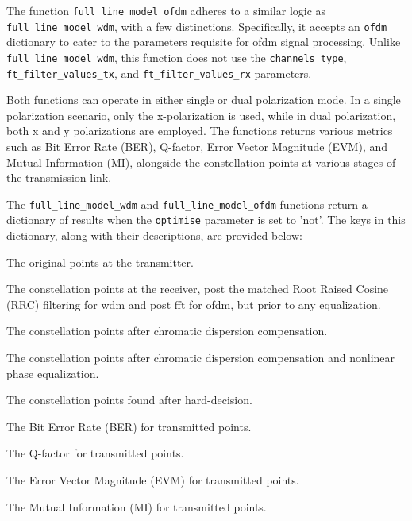 The function \texttt{full\_line\_model\_ofdm} adheres to a similar logic as \texttt{full\_line\_model\_wdm}, with a few distinctions. Specifically, it accepts an \texttt{ofdm} dictionary to cater to the parameters requisite for \Gls{ofdm} signal processing. Unlike \texttt{full\_line\_model\_wdm}, this function does not use the \texttt{channels\_type}, \texttt{ft\_filter\_values\_tx}, and \texttt{ft\_filter\_values\_rx} parameters.


Both functions can operate in either single or dual polarization mode. In a single polarization scenario, only the x-polarization is used, while in dual polarization, both x and y polarizations are employed. The functions returns various metrics such as Bit Error Rate (BER), Q-factor, Error Vector Magnitude (EVM), and Mutual Information (MI), alongside the constellation points at various stages of the transmission link.

The \texttt{full\_line\_model\_wdm} and \texttt{full\_line\_model\_ofdm} functions return a dictionary of results when the \texttt{optimise} parameter is set to 'not'. The keys in this dictionary, along with their descriptions, are provided below:

\begin{description}[style=multiline, leftmargin=4cm, font=\normalfont]
    \item[\texttt{points\_orig}] The original points at the transmitter.
    \item[\texttt{points\_noneq}] The constellation points at the receiver, post the matched Root Raised Cosine (RRC) filtering for \acrshort{wdm} and post \acrshort{fft} for \acrshort{ofdm}, but prior to any equalization.
    \item[\texttt{points}] The constellation points after chromatic dispersion compensation.
    \item[\texttt{points\_shifted}] The constellation points after chromatic dispersion compensation and nonlinear phase equalization.
    \item[\texttt{points\_found}] The constellation points found after hard-decision.
    \item[\texttt{ber}] The Bit Error Rate (BER) for transmitted points.
    \item[\texttt{q}] The Q-factor for transmitted points.
    \item[\texttt{evm}] The Error Vector Magnitude (EVM) for transmitted points.
    \item[\texttt{mi}] The Mutual Information (MI) for transmitted points.
\end{description}

